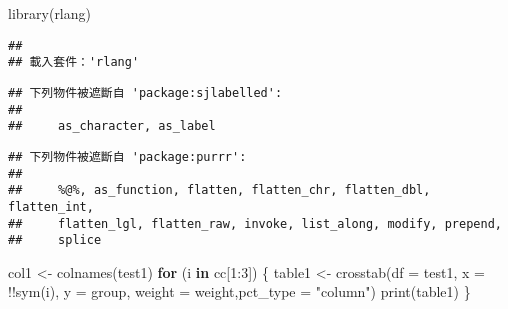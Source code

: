\documentclass[
]{article}
\newenvironment{Shaded}{\begin{snugshade}}{\end{snugshade}}
\newcommand{\AttributeTok}[1]{\textcolor[rgb]{0.77,0.63,0.00}{#1}}
\newcommand{\ControlFlowTok}[1]{\textcolor[rgb]{0.13,0.29,0.53}{\textbf{#1}}}
\newcommand{\DecValTok}[1]{\textcolor[rgb]{0.00,0.00,0.81}{#1}}
\newcommand{\FunctionTok}[1]{\textcolor[rgb]{0.00,0.00,0.00}{#1}}
\newcommand{\NormalTok}[1]{#1}
\newcommand{\OtherTok}[1]{\textcolor[rgb]{0.56,0.35,0.01}{#1}}
\newcommand{\SpecialCharTok}[1]{\textcolor[rgb]{0.00,0.00,0.00}{#1}}
\newcommand{\StringTok}[1]{\textcolor[rgb]{0.31,0.60,0.02}{#1}}
\begin{document}
\begin{Shaded}
\begin{Highlighting}[]
\FunctionTok{library}\NormalTok{(rlang)}
\end{Highlighting}
\end{Shaded}

\begin{verbatim}
## 
## 載入套件：'rlang'
\end{verbatim}

\begin{verbatim}
## 下列物件被遮斷自 'package:sjlabelled':
## 
##     as_character, as_label
\end{verbatim}

\begin{verbatim}
## 下列物件被遮斷自 'package:purrr':
## 
##     %@%, as_function, flatten, flatten_chr, flatten_dbl, flatten_int,
##     flatten_lgl, flatten_raw, invoke, list_along, modify, prepend,
##     splice
\end{verbatim}

\begin{Shaded}
\begin{Highlighting}[]
\NormalTok{col1 }\OtherTok{\textless{}{-}} \FunctionTok{colnames}\NormalTok{(test1)}
\ControlFlowTok{for}\NormalTok{ (i }\ControlFlowTok{in}\NormalTok{ cc[}\DecValTok{1}\SpecialCharTok{:}\DecValTok{3}\NormalTok{]) \{}
\NormalTok{  table1 }\OtherTok{\textless{}{-}} \FunctionTok{crosstab}\NormalTok{(}\AttributeTok{df =}\NormalTok{ test1, }\AttributeTok{x =} \SpecialCharTok{!!}\FunctionTok{sym}\NormalTok{(i), }\AttributeTok{y =}\NormalTok{ group, }\AttributeTok{weight =}\NormalTok{ weight,}\AttributeTok{pct\_type =} \StringTok{"column"}\NormalTok{)}
  \FunctionTok{print}\NormalTok{(table1)}
\NormalTok{\}}
\end{Highlighting}
\end{Shaded}
\end{document}
